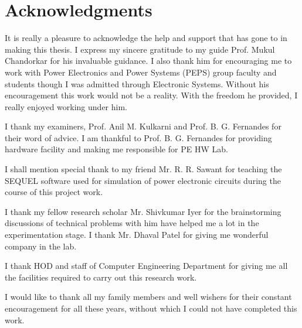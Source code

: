 
\chapter*{Acknowledgments}
\thispagestyle{empty}
It is really a pleasure to acknowledge the help and support that has gone to in making this thesis. I express my sincere gratitude to my guide Prof. Mukul Chandorkar for his invaluable guidance. I also thank him for encouraging me to work with Power Electronics and Power Systems (PEPS) group faculty and students though I was admitted through Electronic Systems. Without his encouragement this work would not be a reality. With the freedom he provided, I really enjoyed working under him.\par

I thank my examiners, Prof. Anil M. Kulkarni and Prof. B. G. Fernandes for their word of advice. I am thankful to Prof. B. G. Fernandes for providing hardware facility and making me responsible for PE HW Lab. \par

I shall mention special thank to my friend Mr. R. R. Sawant for teaching the SEQUEL software used for simulation of power electronic circuits during the course of this project work.\par 

I thank my fellow research scholar  Mr. Shivkumar Iyer  for the brainstorming discussions of technical problems with him have helped me a lot in the experimentation stage. I thank Mr. Dhaval Patel for giving me wonderful company in the lab.\par

I thank HOD and staff of Computer Engineering Department for giving me all the facilities required to carry out this research work. \par

I would like to thank all my family members and well wishers for their constant encouragement for all these years, without which I could not have completed this work.
   


